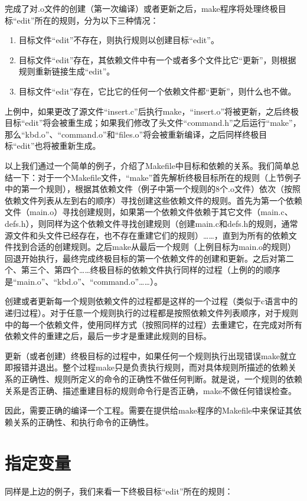 完成了对.o文件的创建（第一次编译）或者更新之后，make程序将处理终极目标“edit”所在的规则，分为以下三种情况：
\begin{enumerate}
\itemsep=0pt \parskip=0pt
\item        目标文件“edit”不存在，则执行规则以创建目标“edit”。
\item        目标文件“edit”存在，其依赖文件中有一个或者多个文件比它“更新”，则根据规则重新链接生成“edit”。
\item       目标文件“edit”存在，它比它的任何一个依赖文件都“更新”，则什么也不做。
\end{enumerate}

上例中，如果更改了源文件“insert.c”后执行make，“insert.o”将被更新，之后终极目标“edit”将会被重生成；如果我们修改了头文件“command.h”之后运行“make”，那么“kbd.o”、“command.o”和“files.o”将会被重新编译，之后同样终极目标“edit”也将被重新生成。

以上我们通过一个简单的例子，介绍了Makefile中目标和依赖的关系。我们简单总结一下：对于一个Makefile文件，“make”首先解析终极目标所在的规则（上节例子中的第一个规则），根据其依赖文件（例子中第一个规则的8个.o文件）依次（按照依赖文件列表从左到右的顺序）寻找创建这些依赖文件的规则。首先为第一个依赖文件（main.o）寻找创建规则，如果第一个依赖文件依赖于其它文件（main.c、defs.h），则同样为这个依赖文件寻找创建规则（创建main.c和defs.h的规则，通常源文件和头文件已经存在，也不存在重建它们的规则）……，直到为所有的依赖文件找到合适的创建规则。之后make从最后一个规则（上例目标为main.o的规则）回退开始执行，最终完成终极目标的第一个依赖文件的创建和更新。之后对第二个、第三个、第四个……终极目标的依赖文件执行同样的过程（上例的的顺序是“main.o”、“kbd.o”、“command.o”……）。

创建或者更新每一个规则依赖文件的过程都是这样的一个过程（类似于c语言中的递归过程）。对于任意一个规则执行的过程都是按照依赖文件列表顺序，对于规则中的每一个依赖文件，使用同样方式（按照同样的过程）去重建它，在完成对所有依赖文件的重建之后，最后一步才是重建此规则的目标。

更新（或者创建）终极目标的过程中，如果任何一个规则执行出现错误make就立即报错并退出。整个过程make只是负责执行规则，而对具体规则所描述的依赖关系的正确性、规则所定义的命令的正确性不做任何判断。就是说，一个规则的依赖关系是否正确、描述重建目标的规则命令行是否正确，make不做任何错误检查。

因此，需要正确的编译一个工程。需要在提供给make程序的Makefile中来保证其依赖关系的正确性、和执行命令的正确性。


\section{指定变量}
同样是上边的例子，我们来看一下终极目标“edit”所在的规则：

